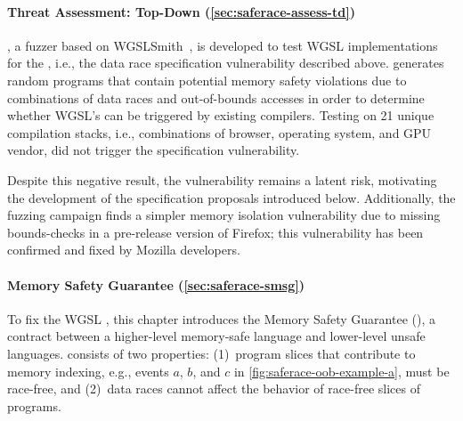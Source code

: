 \paragraph{Threat Assessment: Top-Down (\mysec\ref{sec:saferace-assess-td})}
\wgslmemsmith, a fuzzer based on WGSLSmith~\cite{lecoeur2023reconditioning}, is developed to test WGSL implementations for the \drsv, i.e., the data race specification vulnerability described above. \wgslmemsmith generates random programs that contain potential memory safety violations due to combinations of data races and out-of-bounds accesses in order to determine whether WGSL's \drsv can be triggered by existing compilers. Testing \wgslmemsmith on 21 unique compilation stacks, i.e., combinations of browser, operating system, and GPU vendor, did not trigger the specification vulnerability.

Despite this negative result, the vulnerability remains a latent risk, motivating the development of the specification proposals introduced below. Additionally, the fuzzing campaign finds a simpler memory isolation vulnerability due to missing bounds-checks in a pre-release version of Firefox; this vulnerability has been confirmed and fixed by Mozilla developers.

\paragraph{\saferace Memory Safety Guarantee (\mysec\ref{sec:saferace-smsg})}
To fix the WGSL \drsv, this chapter introduces the \saferace Memory Safety Guarantee (\smsg), a contract between a higher-level memory-safe language and lower-level unsafe languages. \smsg consists of two properties: (1)~program slices that contribute to memory indexing, e.g., events $a$, $b$, and $c$ in \myfig\ref{fig:saferace-oob-example-a}, must be race-free, and (2)~data races cannot affect the behavior of race-free slices of programs.

